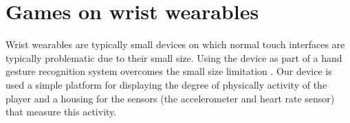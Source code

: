 \documentclass{SIGCHI2015LaTex/sigchi}
\begin{document}
\section{Games on wrist wearables}
Wrist wearables are typically small devices on which normal touch interfaces are typically problematic due to their small size. Using the device as part of a hand gesture recognition system overcomes the small size limitation \cite{kim2007gesture}. Our device is used a simple platform for displaying the degree of physically activity of the player and a housing for the sensors (the accelerometer and heart rate sensor) that measure this activity. 



%
%
%
%
%
%
%
%
%
\end{document}
